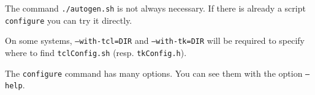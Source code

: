 The command {\tt ./autogen.sh} is not always necessary. If there is
already a script {\tt configure} you can try it directly.

On some systems, {\tt --with-tcl=DIR} and {\tt --with-tk=DIR} will be
required to specify where to find {\tt tclConfig.sh} (resp. {\tt tkConfig.h}). 

The {\tt configure} command has many options. You can see them with the
option {\tt --help}. 


